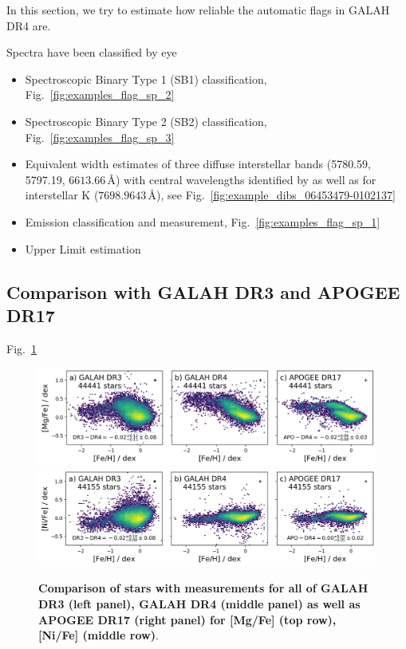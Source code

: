 \documentclass[
  journal=pasa,
  manuscript=research-paper, %
  year=2023,
  volume=37
]{cup-journal}
\begin{document}
In this section, we try to estimate how reliable the automatic flags in GALAH DR4 are.

Spectra have been classified by eye

\begin{itemize}
    \item Spectroscopic Binary Type 1 (SB1) classification, Fig.~\ref{fig:examples_flag_sp_2}
    \item Spectroscopic Binary Type 2 (SB2) classification, Fig.~\ref{fig:examples_flag_sp_3}
    \item Equivalent width estimates of three diffuse interstellar bands (5780.59, 5797.19, $6613.66\,\text{\AA}$) with central wavelengths identified by \citet{Vogrincic2023} as well as for interstellar K ($7698.9643\,\text{\AA}$), see Fig.~\ref{fig:example_dibs_06453479-0102137}
    \item Emission classification and measurement, Fig.~\ref{fig:examples_flag_sp_1}
    \item Upper Limit estimation
\end{itemize}

\subsection{Comparison with GALAH DR3 and APOGEE DR17}

Fig.~\ref{fig:comparison_dr4_dr3_apo17}

\begin{figure}
 \centering
 \includegraphics[width=\textwidth]{figures/comparison_dr4_dr3_apo17_Mg_fe.png}
 \includegraphics[width=\textwidth]{figures/comparison_dr4_dr3_apo17_Ni_fe.png}
 \caption{\textbf{Comparison of stars with measurements for all of GALAH DR3 (left panel), GALAH DR4 (middle panel) as well as APOGEE DR17 (right panel) for [Mg/Fe] (top row), [Ni/Fe] (middle row)}.}
 \label{fig:comparison_dr4_dr3_apo17}
\end{figure}
\end{document}
